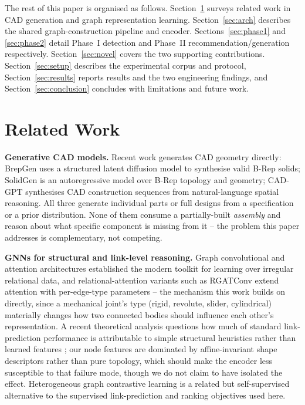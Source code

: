 \documentclass[sn-mathphys,Numbered]{sn-jnl}
\begin{document}
The rest of this paper is organised as follows. Section~\ref{sec:related} surveys related work in CAD generation and graph representation learning. Section~\ref{sec:arch} describes the shared graph-construction pipeline and encoder. Sections~\ref{sec:phase1} and \ref{sec:phase2} detail Phase~I detection and Phase~II recommendation/generation respectively. Section~\ref{sec:novel} covers the two supporting contributions. Section~\ref{sec:setup} describes the experimental corpus and protocol, Section~\ref{sec:results} reports results and the two engineering findings, and Section~\ref{sec:conclusion} concludes with limitations and future work.

\section{Related Work}\label{sec:related}

\textbf{Generative CAD models.} Recent work generates CAD geometry directly: BrepGen \cite{brepgen2024} uses a structured latent diffusion model to synthesise valid B-Rep solids; SolidGen \cite{solidgen2024} is an autoregressive model over B-Rep topology and geometry; CAD-GPT \cite{cadgpt2025} synthesises CAD construction sequences from natural-language spatial reasoning. All three generate individual parts or full designs from a specification or a prior distribution. None of them consume a partially-built \emph{assembly} and reason about what specific component is missing from it -- the problem this paper addresses is complementary, not competing.

\textbf{GNNs for structural and link-level reasoning.} Graph convolutional and attention architectures \cite{kipf2017gcn,velickovic2018gat,hamilton2017sage} established the modern toolkit for learning over irregular relational data, and relational-attention variants such as RGATConv \cite{busbridge2019rgat} extend attention with per-edge-type parameters -- the mechanism this work builds on directly, since a mechanical joint's type (rigid, revolute, slider, cylindrical) materially changes how two connected bodies should influence each other's representation. A recent theoretical analysis questions how much of standard link-prediction performance is attributable to simple structural heuristics rather than learned features \cite{linkheuristics2024}; our node features are dominated by affine-invariant shape descriptors rather than pure topology, which should make the encoder less susceptible to that failure mode, though we do not claim to have isolated the effect. Heterogeneous graph contrastive learning \cite{heterognn2023} is a related but self-supervised alternative to the supervised link-prediction and ranking objectives used here.
\end{document}
